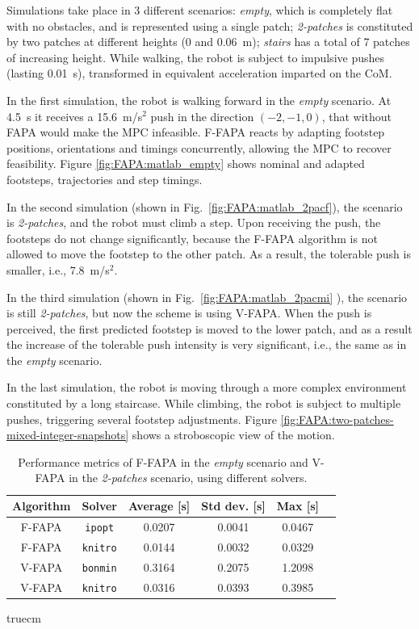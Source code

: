 Simulations take place in 3 different scenarios: {\em empty}, which is completely flat with no obstacles, and is represented using a single patch; {\em 2-patches} is constituted by two patches at different heights (0 and 0.06~m); {\em stairs} has a total of 7 patches of increasing height. While walking, the robot is subject to impulsive pushes (lasting 0.01~s), transformed in equivalent acceleration imparted on the CoM.

In the first simulation, the robot is walking forward in the {\em empty} scenario. At 4.5~s it receives a 15.6~m/s$^2$ push in the direction $(-2, -1, 0)$, that without FAPA would make the MPC infeasible. F-FAPA reacts by adapting footstep positions, orientations and timings concurrently, allowing the MPC to recover feasibility. Figure \ref{fig:FAPA:matlab_empty} shows nominal and adapted footsteps, trajectories and step timings.

In the second simulation (shown in Fig.~\ref{fig:FAPA:matlab_2pacf}), the scenario is {\em 2-patches}, and the robot must climb a step. Upon receiving the push, the footsteps do not change significantly, because the F-FAPA algorithm is not allowed to move the footstep to the other patch. As a result, the tolerable push is smaller, i.e., 7.8~m/s$^2$.

In the third simulation (shown in Fig.~\ref{fig:FAPA:matlab_2pacmi} ), the scenario is still {\em 2-patches}, but now the scheme is using V-FAPA. When the push is perceived, the first predicted footstep is moved to the lower patch, and as a result the increase of the tolerable push intensity is very significant, i.e., the same as in the {\em empty} scenario.

In the last simulation, the robot is moving through a more complex environment constituted by a long staircase. While climbing, the robot is subject to multiple pushes, triggering several footstep adjustments. Figure \ref{fig:FAPA:two-patches-mixed-integer-snapshots} shows a stroboscopic view of the motion.

\begin{table}
    \centering
    \begin{tabular}{*{6}{c}}
        Algorithm & Solver & Average [s] & Std dev. [s] & Max [s] \\
        \hline
        F-FAPA & \texttt{ipopt} & 0.0207 & 0.0041 & 0.0467 \\
        F-FAPA & \texttt{knitro} & 0.0144 & 0.0032 & 0.0329 \\
        V-FAPA & \texttt{bonmin} & 0.3164 & 0.2075 & 1.2098 \\
        V-FAPA & \texttt{knitro} & 0.0316 & 0.0393 & 0.3985
    \end{tabular}
    \caption{Performance metrics of F-FAPA in the {\em empty} scenario and V-FAPA in the {\em 2-patches} scenario, using different solvers.}
    \label{tab:benchmarks}
     truecm
\end{table}

